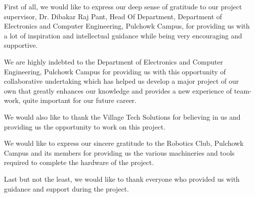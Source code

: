 \thispagestyle{plain}
\begin{center}
	\large
	\vspace{0.4cm}	
\end{center}
First of all, we would like to express our deep sense of gratitude to our project supervisor, Dr. Dibakar Raj Pant, Head Of Department, Department of Electronics and Computer Engineering, Pulchowk Campus, for providing us with a lot of inspiration and intellectual guidance while being very encouraging and supportive.

We are highly indebted to the Department of Electronics and Computer Engineering, Pulchowk Campus for providing us with this opportunity of collaborative undertaking which has helped us develop a major project of our own that greatly enhances our knowledge and provides a new experience of team-work, quite important for our future career.

We would also like to thank the Village Tech Solutions for believing in us and providing us the opportunity to work on this project.

We would like to express our sincere gratitude to the Robotics Club, Pulchowk Campus and its members for providing us the various machineries and tools required to complete the hardware of the project.

Last but not the least, we would like to thank everyone who provided us with guidance and support during the project.

